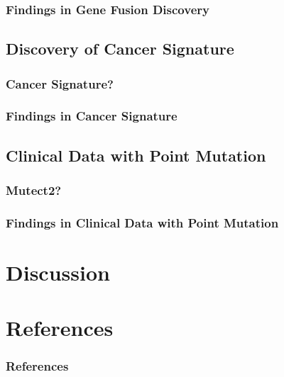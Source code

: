 \documentclass{beamer}
\begin{document}
    \begin{frame}
        \frametitle{Findings in Gene Fusion Discovery}
    \end{frame}

    \subsection{Discovery of Cancer Signature}
    \begin{frame}
        \frametitle{Cancer Signature?}
    \end{frame}

    \begin{frame}
        \frametitle{Findings in Cancer Signature}
    \end{frame}

    \subsection{Clinical Data with Point Mutation}
    \begin{frame}
        \frametitle{Mutect2?}
    \end{frame}

    \begin{frame}
        \frametitle{Findings in Clinical Data with Point Mutation}
    \end{frame}

    \section{Discussion}

    \section{References}
    \begin{frame}[allowframebreaks]
        \frametitle{References}
        
        
    \end{frame}
\end{document}

